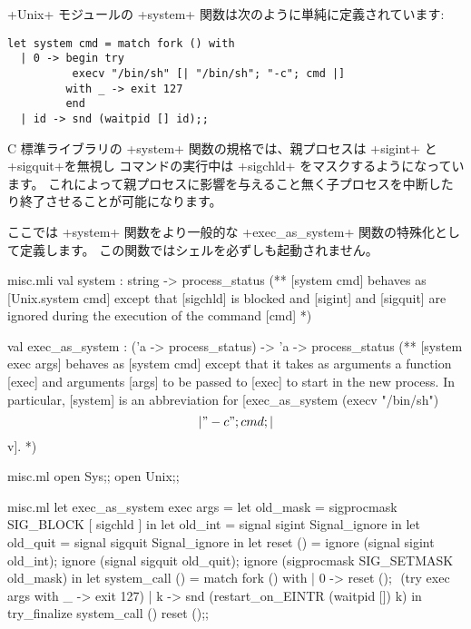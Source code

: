 \begin{example}
\ml+Unix+ モジュールの \ml+system+ 関数は次のように単純に定義されています:
%
\begin{lstlisting}
let system cmd = match fork () with
  | 0 -> begin try
          execv "/bin/sh" [| "/bin/sh"; "-c"; cmd |]
         with _ -> exit 127
         end
  | id -> snd (waitpid [] id);;
\end{lstlisting}
%
C 標準ライブラリの \ml+system+ 関数の規格では、親プロセスは \ml+sigint+ と \ml+sigquit+を無視し
コマンドの実行中は \ml+sigchld+ をマスクするようになっています。
これによって親プロセスに影響を与えること無く子プロセスを中断したり終了させることが可能になります。

ここでは \ml+system+ 関数をより一般的な \ml+exec_as_system+ 関数の特殊化として定義します。
この関数ではシェルを必ずしも起動されません。
%
\begin{codefile}{misc.mli}
val system : string -> process_status
(** [system cmd] behaves as [Unix.system cmd] except that [sigchld] is
blocked and [sigint] and [sigquit] are ignored during the execution
of the command [cmd] *)

val exec_as_system : ('a -> process_status) -> 'a -> process_status
(** [system exec args] behaves as [system cmd] except that it takes as
arguments a function [exec] and arguments [args] to be passed to [exec]
to start in the new process. In particular, [system] is an abbreviation for
[exec_as_system (execv "/bin/sh") \[|"-c"; cmd; |\] v]. *)
\end{codefile}
%
\begin{codefile}{misc.ml}
open Sys;;
open Unix;;
\end{codefile}
%
\begin{listingcodefile}[style=numbers]{misc.ml}
let exec_as_system exec args =
  let old_mask = sigprocmask SIG_BLOCK [ sigchld ] in
  let old_int = signal sigint Signal_ignore in
  let old_quit = signal sigquit Signal_ignore in
  let reset () =
    ignore (signal sigint old_int);
    ignore (signal sigquit old_quit);
    ignore (sigprocmask SIG_SETMASK old_mask) in
  let system_call () = match fork () with
    | 0 ->
        reset (); $\label{prog:sreset}$
        (try exec args with _ -> exit 127)
    | k ->
        snd (restart_on_EINTR (waitpid []) k) in
  try_finalize system_call () reset ();; $\label{prog:stry}$


\end{listingcodefile}
\end{example}
